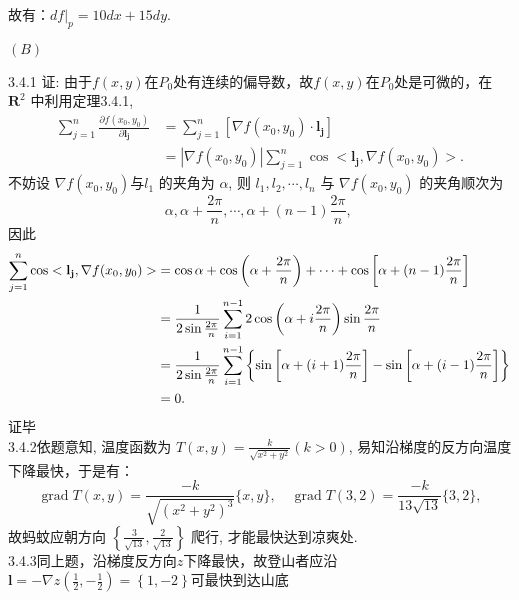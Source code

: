 \documentclass[a4paper,11pt,UTF8]{article}
\begin{document}
故有：$\left.d f\right|_p=10 d x+15 d y .$\\
\centerline{$(B)$}
3.4.1\quad
证: 由于$f(x,y)$在$P_0$处有连续的偏导数，故$f(x,y)$在$P_0$处是可微的，在 $\mathbf{R}^2$ 中利用定理3.4.1,
$$
\begin{aligned}
	\sum_{j=1}^n \frac{\partial f\left(x_0, y_0\right)}{\partial \mathbf{l_j}} & =\sum_{j=1}^n[\nabla f\left(x_0, y_0\right) \cdot\mathbf{l_j}] \\
	& =|\nabla f(x_0,y_0)| \sum_{j=1}^n \cos <\mathbf{l_j}, \nabla f(x_0,y_0)> .
\end{aligned}
$$
不妨设 $\nabla f(x_0,y_0) $与$l_1$  的夹角为 $\alpha$, 则 $l_1, l_2, \cdots, l_n$ 与 $\nabla f(x_0,y_0)$ 的夹角顺次为
$$
\alpha, \alpha+\frac{2 \pi}{n}, \cdots, \alpha+(n-1) \frac{2 \pi}{n} \text {, }
$$
因此
$$
\begin{aligned}
\sum_{j=1}^n \cos <\mathbf{l_j}, \nabla f(x_0,y_0)> & =\cos \alpha+\cos \left(\alpha+\frac{2 \pi}{n}\right)+\cdots+\cos \left[\alpha+(n-1) \frac{2 \pi}{n}\right] \\
	& =\frac{1}{2 \sin \frac{2 \pi}{n}} \sum_{i=1}^{n-1} 2 \cos \left(\alpha+i \frac{2 \pi}{n}\right) \sin \frac{2 \pi}{n} \\
	& =\frac{1}{2 \sin \frac{2 \pi}{n}} \sum_{i=1}^{n-1}\left\{\sin \left[\alpha+(i+1) \frac{2 \pi}{n}\right]-\sin \left[\alpha+(i-1) \frac{2 \pi}{n}\right]\right\} \\
	& =0 .
\end{aligned}\\
$$
证毕\\
3.4.2\quad 依题意知, 温度函数为 $T(x, y)=\frac{k}{\sqrt{x^2+y^2}}$$(k>0)$, 易知沿梯度的反方向温度下降最快，于是有：
$$
\operatorname{grad} T(x, y)=\frac{-k}{\sqrt{\left(x^2+y^2\right)^3}}\{x, y\}, \quad \operatorname{grad} T(3,2)=\frac{-k}{13 \sqrt{13}}\{3,2\},
$$
故蚂蚊应朝方向 $\left\{\frac{3}{\sqrt{13}}, \frac{2}{\sqrt{13}}\right\}$ 爬行, 才能最快达到凉爽处.\\
3.4.3\quad 同上题，沿梯度反方向$z$下降最快，故登山者应沿$\mathbf{l}=-\nabla z(\frac{1}{2},-\frac{1}{2})=\left\{1,-2\right\}$可最快到达山底
\end{document}
